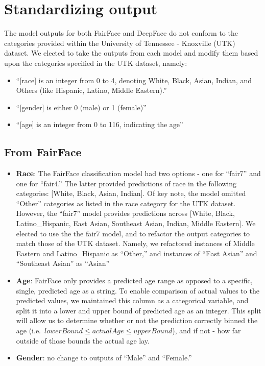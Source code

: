 \documentclass[
  letterpaper,
  DIV=11,
  numbers=noendperiod]{scrreprt}
\begin{document}
\hypertarget{standardizing-output}{%
\section{Standardizing output}\label{standardizing-output}}

The model outputs for both FairFace and DeepFace do not conform to the
categories provided within the University of Tennessee - Knoxville (UTK)
dataset. We elected to take the outputs from each model and modify them
based upon the categories specified in the UTK dataset, namely:

\begin{itemize}
\item
  ``{[}race{]} is an integer from 0 to 4, denoting White, Black, Asian,
  Indian, and Others (like Hispanic, Latino, Middle Eastern).''
\item
  ``{[}gender{]} is either 0 (male) or 1 (female)''
\item
  ``{[}age{]} is an integer from 0 to 116, indicating the age''
\end{itemize}

\hypertarget{from-fairface}{%
\subsection{From FairFace}\label{from-fairface}}

\begin{itemize}
\item
  \textbf{Race}: The FairFace classification model had two options - one
  for ``fair7'' and one for ``fair4.'' The latter provided predictions
  of race in the following categories: {[}White, Black, Asian,
  Indian{]}. Of key note, the model omitted ``Other'' categories as
  listed in the race category for the UTK dataset. However, the
  ``fair7'' model provides predictions across {[}White, Black,
  Latino\_Hispanic, East Asian, Southeast Asian, Indian, Middle
  Eastern{]}. We elected to use the the fair7 model, and to refactor the
  output categories to match those of the UTK dataset. Namely, we
  refactored instances of Middle Eastern and Latino\_Hispanic as
  ``Other,'' and instances of ``East Asian'' and ``Southeast Asian'' as
  ``Asian''
\item
  \textbf{Age}: FairFace only provides a predicted age range as opposed
  to a specific, single, predicted age as a string. To enable comparison
  of actual values to the predicted values, we maintained this column as
  a categorical variable, and split it into a lower and upper bound of
  predicted age as an integer. This split will allow us to determine
  whether or not the prediction correctly binned the age
  (i.e.~\(lowerBound \leq actualAge \leq upperBound\)), and if not - how
  far outside of those bounds the actual age lay.
\item
  \textbf{Gender}: no change to outputs of ``Male'' and ``Female.''
\end{itemize}
\end{document}
